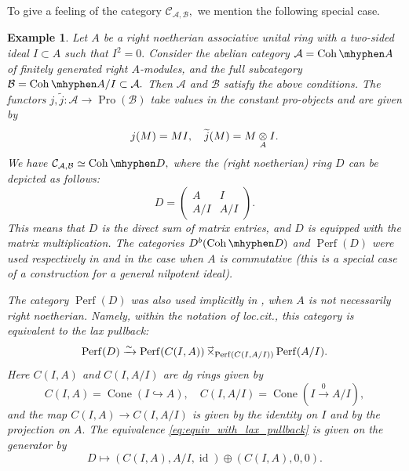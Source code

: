 \documentclass[11pt,leqno]{amsart}
\newtheorem{example}[theo]{Example}
\numberwithin{equation}{section}
\def\wt{\widetilde}
\newcommand{\tens}[1]{%
  \mathbin{\mathop{\otimes}\displaylimits_{#1}}%
}
\newcommand{\laxtimes}[1]{\mathop{\times\mkern-13mu\raise1.3ex\hbox{$\scriptscriptstyle\to$}_{#1}}}
\newcommand{\hy}{\mhyphen}
\newcommand{\xto}{\xrightarrow}
\newcommand{\hto}{\hookrightarrow}
\newcommand{\Coh}{\operatorname{Coh}}
\newcommand{\Cone}{\operatorname{Cone}}
\newcommand{\cA}{{\mathcal A}}
\newcommand{\cB}{{\mathcal B}}
\newcommand{\cC}{{\mathcal C}}
\newcommand{\Perf}{\operatorname{Perf}}
\newcommand{\Pro}{\operatorname{Pro}}
\newcommand{\id}{\operatorname{id}}
\begin{document}
To give a feeling of the category $\cC_{\cA,\cB},$ we mention the following special case.

\begin{example}\label{ex:familiar_example}
Let $A$ be a right noetherian associative unital ring with a two-sided ideal $I\subset A$ such that $I^2=0.$ Consider the abelian category $\cA=\Coh\hy A$ of finitely generated right $A$-modules, and the full subcategory $\cB=\Coh\hy A/I\subset \cA.$ Then $\cA$ and $\cB$ satisfy the above conditions. The functors $j,\wt{j}:\cA\to\Pro(\cB)$ take values in the constant pro-objects and are given by
\begin{equation*}
j(M)=MI,\quad \wt{j}(M)=M\tens{A}I.
\end{equation*}
We have $\cC_{\cA,\cB}\simeq \Coh\hy D,$ where the (right noetherian) ring $D$ can be depicted as follows:
\begin{equation*}
D=\begin{pmatrix}
	A & I\\
	A/I & A/I
\end{pmatrix}.
\end{equation*}
This means that $D$ is the direct sum of matrix entries, and $D$ is equipped with the matrix multiplication. The categories $D^b(\Coh\hy D)$ and $\Perf(D)$ were used respectively in \cite[Section 8.1]{E20} and \cite[Section 5]{KL15} in the case when $A$ is commutative (this is a special case of a construction for a general nilpotent ideal).

The category $\Perf(D)$ was also used implicitly in \cite[Proofs of Theorem 2.25 and Corollary 3.5]{LT19}, when $A$ is not necessarily right noetherian. Namely, within the notation of loc.cit., this category is equivalent to the lax pullback:
\begin{equation}\label{eq:equiv_with_lax_pullback}
\Perf(D)\xto{\sim}\Perf(C(I,A))\laxtimes{\Perf(C(I,A/I))} \Perf(A/I).
\end{equation}
Here $C(I,A)$ and $C(I,A/I)$ are dg rings given by
\begin{equation*}
C(I,A)=\Cone(I\hto A),\quad C(I,A/I)=\Cone(I\xto{0}A/I),
\end{equation*}
and the map $C(I,A)\to C(I,A/I)$ is given by the identity on $I$ and by the projection on $A.$ The equivalence \eqref{eq:equiv_with_lax_pullback} is given on the generator by 
\begin{equation*}
D\mapsto (C(I,A),A/I,\id)\oplus (C(I,A),0,0).
\end{equation*}
\end{example}
\end{document}

